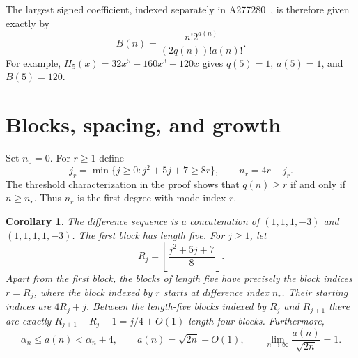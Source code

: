 \documentclass[11pt]{article}
\newtheorem{corollary}[theorem]{Corollary}
\newcommand{\floor}[1]{\left\lfloor #1\right\rfloor}
\begin{document}
The largest signed coefficient, indexed separately in A277280~\cite{signedvalue},
is therefore given exactly by
\begin{equation}\label{eq:maxvalue}
 B(n)=\frac{n!2^{a(n)}}{(2q(n))!a(n)!}.
\end{equation}
For example, $H_5(x)=32x^5-160x^3+120x$ gives $q(5)=1$,
$a(5)=1$, and $B(5)=120$.

\section{Blocks, spacing, and growth}
Set $n_0=0$. For $r\geq1$ define
\begin{equation}\label{eq:thresholds}
 j_r=\min\{j\geq0:j^2+5j+7\geq8r\},\qquad n_r=4r+j_r.
\end{equation}
The threshold characterization in the proof shows that $q(n)\geq r$
if and only if $n\geq n_r$. Thus $n_r$ is the first degree with mode index $r$.

\begin{corollary}\label{cor:blocks}
The difference sequence is a concatenation of
$(1,1,1,-3)$ and $(1,1,1,1,-3)$. The first block has length five.
For $j\geq1$, let
\begin{equation}\label{eq:R}
 R_j=\floor{\frac{j^2+5j+7}{8}}.
\end{equation}
Apart from the first block, the blocks of length five have precisely
the block indices $r=R_j$, where the block indexed by $r$ starts at
difference index $n_r$. Their starting indices are $4R_j+j$.
Between the length-five blocks indexed by $R_j$ and $R_{j+1}$ there are
exactly $R_{j+1}-R_j-1=j/4+O(1)$ length-four blocks.
Furthermore,
\begin{equation}\label{eq:asymptotic}
 \alpha_n\leq a(n)<\alpha_n+4,\qquad
 a(n)=\sqrt{2n}+O(1),\qquad
 \lim_{n\to\infty}\frac{a(n)}{\sqrt{2n}}=1.
\end{equation}
\end{corollary}
\end{document}
